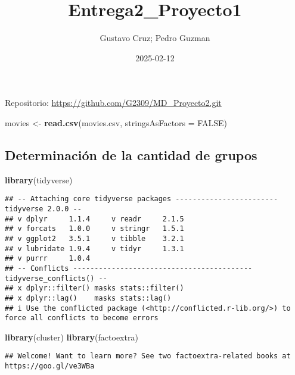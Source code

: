 \documentclass[
]{article}
\title{Entrega2\_Proyecto1}
\author{Gustavo Cruz; Pedro Guzman}
\date{2025-02-12}
\newenvironment{Shaded}{\begin{snugshade}}{\end{snugshade}}
\newcommand{\AttributeTok}[1]{\textcolor[rgb]{0.13,0.29,0.53}{#1}}
\newcommand{\ConstantTok}[1]{\textcolor[rgb]{0.56,0.35,0.01}{#1}}
\newcommand{\FunctionTok}[1]{\textcolor[rgb]{0.13,0.29,0.53}{\textbf{#1}}}
\newcommand{\NormalTok}[1]{#1}
\newcommand{\OtherTok}[1]{\textcolor[rgb]{0.56,0.35,0.01}{#1}}
\newcommand{\StringTok}[1]{\textcolor[rgb]{0.31,0.60,0.02}{#1}}
\begin{document}
\maketitle

Repositorio: \url{https://github.com/G2309/MD_Proyecto2.git}

\begin{Shaded}
\begin{Highlighting}[]
\NormalTok{movies }\OtherTok{\textless{}{-}} \FunctionTok{read.csv}\NormalTok{(}\StringTok{\textquotesingle{}movies.csv\textquotesingle{}}\NormalTok{, }\AttributeTok{stringsAsFactors =} \ConstantTok{FALSE}\NormalTok{)}
\end{Highlighting}
\end{Shaded}

\subsection{Determinación de la cantidad de
grupos}\label{determinaciuxf3n-de-la-cantidad-de-grupos}

\begin{Shaded}
\begin{Highlighting}[]
\FunctionTok{library}\NormalTok{(tidyverse)}
\end{Highlighting}
\end{Shaded}

\begin{verbatim}
## -- Attaching core tidyverse packages ------------------------ tidyverse 2.0.0 --
## v dplyr     1.1.4     v readr     2.1.5
## v forcats   1.0.0     v stringr   1.5.1
## v ggplot2   3.5.1     v tibble    3.2.1
## v lubridate 1.9.4     v tidyr     1.3.1
## v purrr     1.0.4     
## -- Conflicts ------------------------------------------ tidyverse_conflicts() --
## x dplyr::filter() masks stats::filter()
## x dplyr::lag()    masks stats::lag()
## i Use the conflicted package (<http://conflicted.r-lib.org/>) to force all conflicts to become errors
\end{verbatim}

\begin{Shaded}
\begin{Highlighting}[]
\FunctionTok{library}\NormalTok{(cluster)}
\FunctionTok{library}\NormalTok{(factoextra)}
\end{Highlighting}
\end{Shaded}

\begin{verbatim}
## Welcome! Want to learn more? See two factoextra-related books at https://goo.gl/ve3WBa
\end{verbatim}
\end{document}
